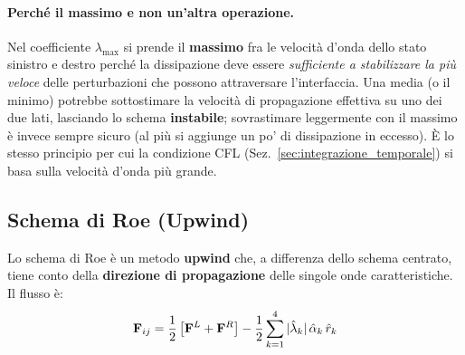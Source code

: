 \paragraph{Perché il massimo e non un'altra operazione.}
Nel coefficiente $\lambda_{\max}$ si prende il \textbf{massimo} fra le velocità d'onda
dello stato sinistro e destro perché la dissipazione deve essere \emph{sufficiente a
stabilizzare la più veloce} delle perturbazioni che possono attraversare
l'interfaccia. Una media (o il minimo) potrebbe sottostimare la velocità di
propagazione effettiva su uno dei due lati, lasciando lo schema \textbf{instabile};
sovrastimare leggermente con il massimo è invece sempre sicuro (al più si aggiunge un
po' di dissipazione in eccesso). È lo stesso principio per cui la condizione CFL
(Sez.~\ref{sec:integrazione_temporale}) si basa sulla velocità d'onda più grande.

\subsection{Schema di Roe (Upwind)}

Lo schema di Roe è un metodo \textbf{upwind} che, a differenza dello schema centrato,
tiene conto della \textbf{direzione di propagazione} delle singole onde
caratteristiche. Il flusso è:
\begin{equation}
  \mathbf{F}_{ij} = \frac{1}{2}\left[\mathbf{F}^L + \mathbf{F}^R\right]
               - \frac{1}{2} \sum_{k=1}^{4} |\hat{\lambda}_k|\, \hat{\alpha}_k\, \hat{r}_k
  \label{eq:roe}
\end{equation}

